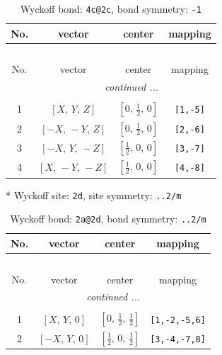 \documentclass[fleqn,8pt]{jsarticle}
\begin{document}
\begin{longtable}{cccc}
\caption{Wyckoff bond: {\tt 4c@2c}, bond symmetry: {\tt -1}}
 \\
 \hline \hline
No. & vector & center & mapping \\ \hline \endfirsthead

\multicolumn{3}{l}{\tablename\ \thetable{}} \\
 \hline \hline
No. & vector & center & mapping \\ \hline \endhead

 \hline \hline
\multicolumn{3}{r}{\footnotesize\it continued ...} \\ \endfoot

 \hline \hline
\multicolumn{3}{r}{} \\ \endlastfoot

1 & $\left[ X,\, Y,\, Z \right]$ & $\left[ 0,\, \frac{1}{2},\, 0 \right]$ & {\tt [1,-5]} \\ \hline
2 & $\left[ - X,\, - Y,\, Z \right]$ & $\left[ 0,\, \frac{1}{2},\, 0 \right]$ & {\tt [2,-6]} \\ \hline
3 & $\left[ - X,\, Y,\, - Z \right]$ & $\left[ \frac{1}{2},\, 0,\, 0 \right]$ & {\tt [3,-7]} \\ \hline
4 & $\left[ X,\, - Y,\, - Z \right]$ & $\left[ \frac{1}{2},\, 0,\, 0 \right]$ & {\tt [4,-8]} \\
\end{longtable}
* Wyckoff site: {\tt 2d}, site symmetry: {\tt ..2/m}
\renewcommand{\arraystretch}{1.2}
\begin{longtable}{cccc}
\caption{Wyckoff bond: {\tt 2a@2d}, bond symmetry: {\tt ..2/m}}
 \\
 \hline \hline
No. & vector & center & mapping \\ \hline \endfirsthead

\multicolumn{3}{l}{\tablename\ \thetable{}} \\
 \hline \hline
No. & vector & center & mapping \\ \hline \endhead

 \hline \hline
\multicolumn{3}{r}{\footnotesize\it continued ...} \\ \endfoot

 \hline \hline
\multicolumn{3}{r}{} \\ \endlastfoot

1 & $\left[ X,\, Y,\, 0 \right]$ & $\left[ 0,\, \frac{1}{2},\, \frac{1}{2} \right]$ & {\tt [1,-2,-5,6]} \\ \hline
2 & $\left[ - X,\, Y,\, 0 \right]$ & $\left[ \frac{1}{2},\, 0,\, \frac{1}{2} \right]$ & {\tt [3,-4,-7,8]} \\
\end{longtable}
\end{document}
